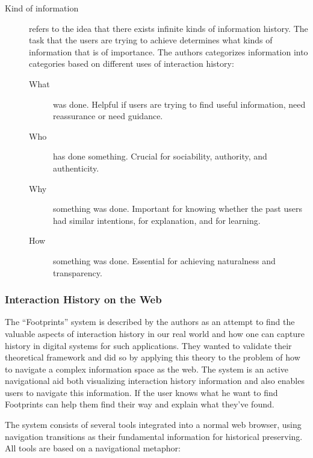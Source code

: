 \documentclass[12pt,a4paper]{article}
\begin{document}
\begin{description}
  \item[Kind of information] refers to the idea that there exists infinite
    kinds of information history. The task that the users are trying to
    achieve determines what kinds of information that is of importance. The
    authors categorizes information into categories based on different uses of
    interaction history:
  \begin{description}
    \item[What] was done. Helpful if users are trying to find useful
      information, need reassurance or need guidance.
    \item[Who] has done something. Crucial for sociability, authority, and
      authenticity. 
    \item[Why] something was done. Important for knowing whether the past users
      had similar intentions, for explanation, and for learning.
    \item[How] something was done. Essential for achieving naturalness and
      transparency.
  \end{description}
\end{description}

\subsubsection{Interaction History on the Web}

The ``Footprints'' system is described by the authors as an attempt to find
the valuable aspects of interaction history in our real world and how one can
capture history in digital systems for such applications. They wanted to
validate their theoretical framework and did so by applying this theory to the
problem of how to navigate a complex information space as the web. The system
is an active navigational aid both visualizing interaction history
information and also enables users to navigate this information. If the user
knows what he want to find Footprints can help them find their way and
explain what they've found.

The system consists of several tools integrated into a normal web browser,
using navigation transitions as their fundamental information for historical
preserving. All tools are based on a navigational metaphor:
\end{document}
